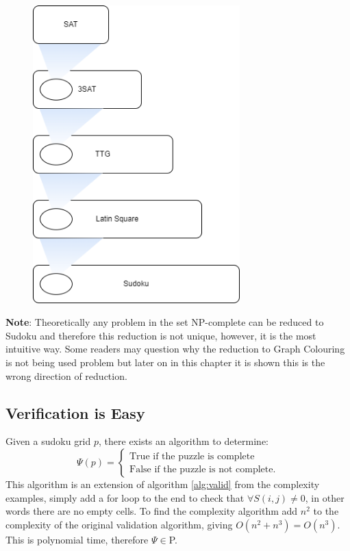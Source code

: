\documentclass[a4paper,11pt]{report}
\begin{document}
\begin{figure}[h!]
	\begin{center}
		\includegraphics[width=80mm]{figures/subset.png}
	\end{center}
	\caption{\label{fig:sudokureduction}}
\end{figure}

\textbf{Note}: Theoretically any problem in the set NP-complete can be reduced to Sudoku and therefore this reduction is not unique, however, it is the most intuitive way. Some readers may question why the reduction to Graph Colouring is not being used problem but later on in this chapter it is shown this is the wrong direction of reduction.

\subsection{Verification is Easy}

Given a sudoku grid $p$, there exists an algorithm to determine:
		\begin{equation}
			\Psi(p) = \begin{cases}	
				\text{True if the puzzle is complete} \\
				\text{False if the puzzle is not complete}.
			\end{cases}
		\end{equation}
This algorithm is an extension of algorithm \ref{alg:valid} from the complexity examples, simply add a for loop to the end to check that $\forall S(i,j) \neq 0 $, in other words there are no empty cells. To find the complexity algorithm add $n^2$ to the complexity of the original validation algorithm, giving $O(n^2+n^3)=O(n^3)$. This is polynomial time, therefore $\Psi\in $P.
\end{document}
